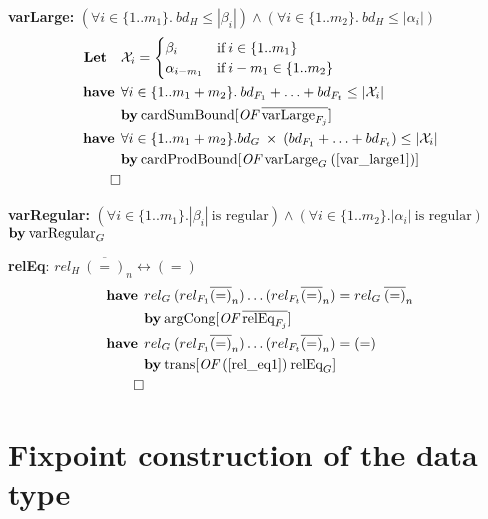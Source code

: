 \textbf{varLarge:} $(\forall i \in \{1..m_1\}. \: bd_H \le |\beta_i|) \wedge (\forall i \in \{1..m_2\}. \: bd_H \le |\alpha_i|)$
\begin{align}
\textbf{Let} \quad & \mathcal{X}_i = \begin{cases}
\beta_i & \text{if} \: i \in \{1..m_1\} \\
\alpha_{i-m_1} & \text{if} \: i - m_1 \in \{1..m_2\}
\end{cases} \nonumber \\
%
\have & \forall i \in \{1..m_1+m_2\}. \: bd_{F_1} + \dots + bd_{F_t} \le |\mathcal{X}_i| \label{var_large1} \\*
& \by \OF{\text{cardSumBound}}{\overline{\text{varLarge}_{F_j}}} \nonumber \\
%
\have & \forall i \in \{1..m_1+m_2\}. bd_G \: \times \: (bd_{F_1} + \dots + bd_{F_t}) \le |\mathcal{X}_i| \\*
& \by \OF{\text{cardProdBound}}{\text{varLarge}_G \: (\ref{var_large1})} \nonumber \\*
\qed \nonumber
\end{align}

\textbf{varRegular:} $(\forall i \in \{1..m_1\}. |\beta_i| \: \text{is regular}) \wedge (\forall i \in \{1..m_2\}. |\alpha_i| \: \text{is regular})$ \\
\hspace*{1.7em} $\textbf{by}\: \text{varRegular}_G$

\vspace*{1.5em}

\textbf{relEq}: $rel_H \: \overline{(=)}_n \longleftrightarrow (=)$
\begin{align}
\have & rel_G \: (rel_{F_1} \overline{(=)}_n)\dots(rel_{F_t} \overline{(=)}_n) = rel_G \: \overline{(=)}_n \label{rel_eq1} \\*
& \by \OF{\text{argCong}}{\overline{\text{relEq}_{F_j}}} \nonumber \\
%
\have & rel_G \: (rel_{F_1} \overline{(=)}_n)\dots(rel_{F_t} \overline{(=)}_n) = (=) \\*
& \by \OF{\text{trans}}{(\ref{rel_eq1}) \: \text{relEq}_G} \nonumber \\*
\qed \nonumber
\end{align}

\section{Fixpoint construction of the data type}\label{sec:fixpoint}

